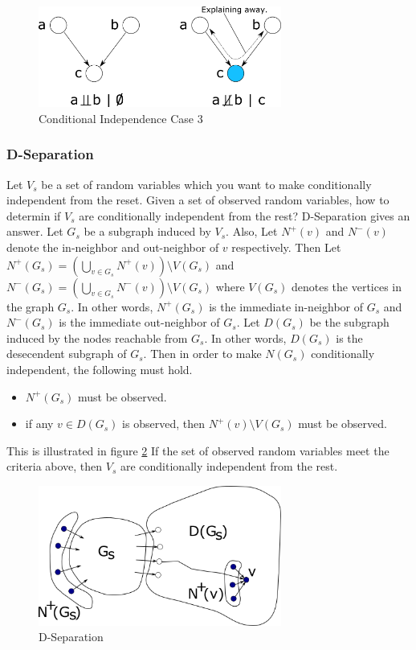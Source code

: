 \documentclass[a4]{article}
\begin{document}
\begin{figure}[!htb]
\centering
\includegraphics[width=8cm]{cond3.png}
\caption{Conditional Independence Case 3}
\label{fig:cond3}
\end{figure}

\subsubsection{D-Separation}
Let $V_s$ be a set of random variables which you want to make conditionally independent from the reset.
Given a set of observed random variables, how to determin if $V_s$ are conditionally independent from the rest?
D-Separation gives an answer. Let $G_s$ be a subgraph induced by $V_s$.
Also, Let $N^+(v)$ and $N^-(v)$ denote the in-neighbor and out-neighbor of $v$ respectively.
Then Let $N^+(G_s) = \left(\bigcup_{v \in G_s} N^+(v)\right) \setminus V(G_s)$ and
$N^-(G_s) = \left(\bigcup_{v \in G_s} N^-(v)\right) \setminus V(G_s)$ where $V(G_s)$ denotes the vertices in the graph $G_s$.
In other words, $N^+(G_s)$ is the immediate in-neighbor of $G_s$ and $N^-(G_s)$ is the immediate out-neighbor of $G_s$.
Let $D(G_s)$ be the subgraph induced by the nodes reachable from $G_s$. In other words, $D(G_s)$ is the desecendent subgraph of $G_s$.
Then in order to make $N(G_s)$ conditionally independent, the following must hold.
\begin{itemize}
\item $N^+(G_s)$ must be observed.
\item if any $v \in D(G_s)$ is observed, then $N^+(v) \setminus V(G_s)$ must be observed.
\end{itemize}
This is illustrated in figure \ref{fig:d-separation}
If the set of observed random variables meet the criteria above, then $V_s$ are conditionally independent from the rest.

\begin{figure}[!htb]
\centering
\includegraphics[width=8cm]{dseparation.png}
\caption{D-Separation}
\label{fig:d-separation}
\end{figure}
\end{document}
